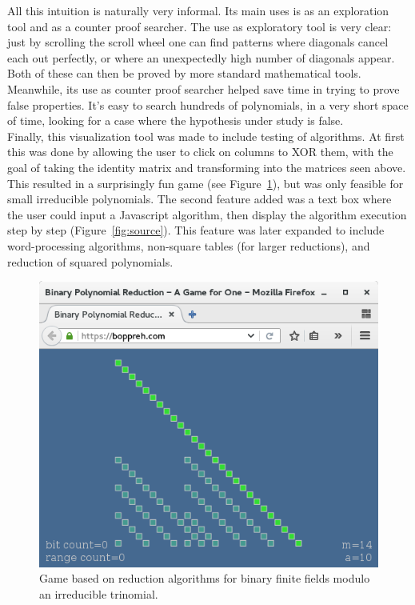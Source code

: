 All this intuition is naturally very informal. Its main uses is as an exploration tool and as a counter proof searcher. The use as exploratory tool is very clear: just by scrolling the scroll wheel one can find patterns where diagonals cancel each out perfectly, or where an unexpectedly high number of diagonals appear. Both of these can then be proved by more standard mathematical tools. Meanwhile, its use as counter proof searcher helped save time in trying to prove false properties. It's easy to search hundreds of polynomials, in a very short space of time, looking for a case where the hypothesis under study is false. \\

Finally, this visualization tool was made to include testing of algorithms. At first this was done by allowing the user to click on columns to XOR them, with the goal of taking the identity matrix and transforming into the matrices seen above. This resulted in a surprisingly fun game (see Figure~\ref{fig:game}), but was only feasible for small irreducible polynomials. The second feature added was a text box where the user could input a Javascript algorithm, then display the algorithm execution step by step (Figure~\ref{fig:source}). This feature was later expanded to include word-processing algorithms, non-square tables (for larger reductions), and reduction of squared polynomials. \\

\begin{figure}
  \caption{Game based on reduction algorithms for binary finite fields modulo an irreducible trinomial.}
  \label{fig:game}
  \centering
  \includegraphics[width = .7\columnwidth]{figures/boppreh.png}
\end{figure}

